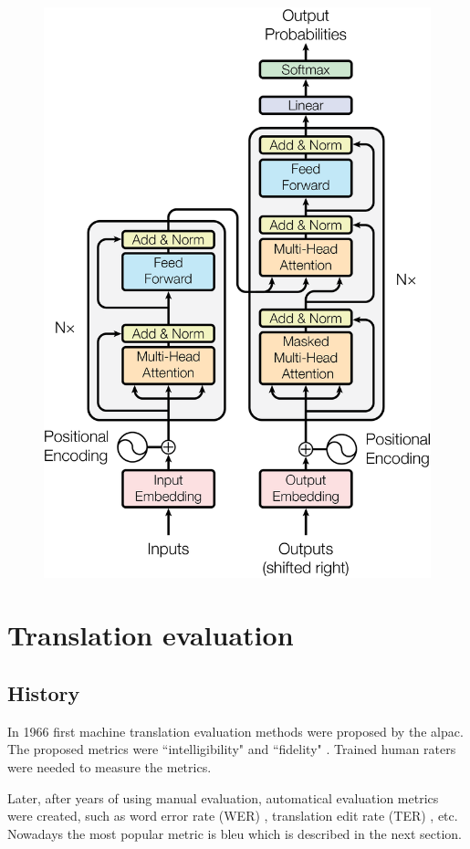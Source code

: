 \begin{figure}[h]
	\centering
	\includegraphics[width=0.5\columnwidth]{img/transformer_architecture.png}
	 {}
	\label{fig:transformer_architecture}
\end{figure}


\section{}
\label{section:bpe}

\section{Translation evaluation}

\subsection{History}

In 1966 first machine translation evaluation methods were proposed
by the \acrfull{alpac}.
The proposed metrics were ``intelligibility" and ``fidelity"
\citep[p~67]{Translation1966}.
Trained human raters were needed to measure the metrics.

Later, after years of using manual evaluation, automatical evaluation
metrics were created, such as word error rate (WER) \cite{Su1992},
translation edit rate (TER) \cite{Snover2006}, etc.
Nowadays the most popular metric is \acrfull{bleu} which is described
in the next section.


